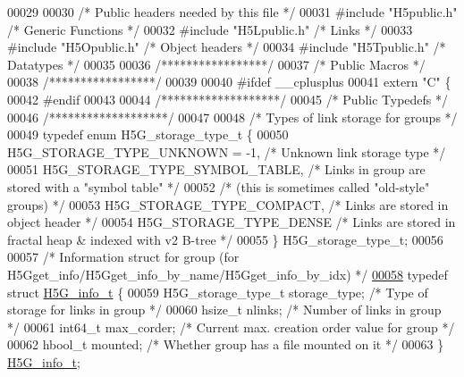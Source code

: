 \begin{DoxyCode}
00029 
00030 \textcolor{comment}{/* Public headers needed by this file */}
00031 \textcolor{preprocessor}{#include "H5public.h"}       \textcolor{comment}{/* Generic Functions            */}
00032 \textcolor{preprocessor}{#include "H5Lpublic.h"}      \textcolor{comment}{/* Links                                */}
00033 \textcolor{preprocessor}{#include "H5Opublic.h"}      \textcolor{comment}{/* Object headers           */}
00034 \textcolor{preprocessor}{#include "H5Tpublic.h"}      \textcolor{comment}{/* Datatypes                */}
00035 
00036 \textcolor{comment}{/*****************/}
00037 \textcolor{comment}{/* Public Macros */}
00038 \textcolor{comment}{/*****************/}
00039 
00040 \textcolor{preprocessor}{#ifdef \_\_cplusplus}
00041 \textcolor{keyword}{extern} \textcolor{stringliteral}{"C"} \{
00042 \textcolor{preprocessor}{#endif}
00043 
00044 \textcolor{comment}{/*******************/}
00045 \textcolor{comment}{/* Public Typedefs */}
00046 \textcolor{comment}{/*******************/}
00047 
00048 \textcolor{comment}{/* Types of link storage for groups */}
00049 \textcolor{keyword}{typedef} \textcolor{keyword}{enum} H5G\_storage\_type\_t \{
00050     H5G\_STORAGE\_TYPE\_UNKNOWN = -1,  \textcolor{comment}{/* Unknown link storage type    */}
00051     H5G\_STORAGE\_TYPE\_SYMBOL\_TABLE,      \textcolor{comment}{/* Links in group are stored with a "symbol table" */}
00052                                         \textcolor{comment}{/* (this is sometimes called "old-style" groups) */}
00053     H5G\_STORAGE\_TYPE\_COMPACT,       \textcolor{comment}{/* Links are stored in object header */}
00054     H5G\_STORAGE\_TYPE\_DENSE      \textcolor{comment}{/* Links are stored in fractal heap & indexed with v2 B-tree */}
00055 \} H5G\_storage\_type\_t;
00056 
00057 \textcolor{comment}{/* Information struct for group (for H5Gget\_info/H5Gget\_info\_by\_name/H5Gget\_info\_by\_idx) */}
\hyperlink{struct_h5_g__info__t}{00058} \textcolor{keyword}{typedef} \textcolor{keyword}{struct }\hyperlink{struct_h5_g__info__t}{H5G\_info\_t} \{
00059     H5G\_storage\_type\_t  storage\_type;   \textcolor{comment}{/* Type of storage for links in group */}
00060     hsize\_t     nlinks;             \textcolor{comment}{/* Number of links in group */}
00061     int64\_t     max\_corder;             \textcolor{comment}{/* Current max. creation order value for group */}
00062     hbool\_t     mounted;                \textcolor{comment}{/* Whether group has a file mounted on it */}
00063 \} \hyperlink{struct_h5_g__info__t}{H5G\_info\_t};

\end{DoxyCode}
